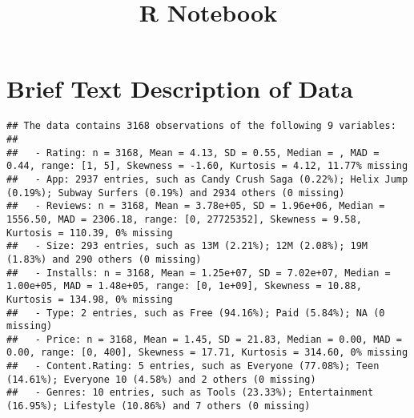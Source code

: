\documentclass[
]{article}
\title{R Notebook}
\author{}
\date{\vspace{-2.5em}}
\begin{document}
\maketitle

\hypertarget{brief-text-description-of-data}{%
\section{Brief Text Description of
Data}\label{brief-text-description-of-data}}

\begin{verbatim}
## The data contains 3168 observations of the following 9 variables:
## 
##   - Rating: n = 3168, Mean = 4.13, SD = 0.55, Median = , MAD = 0.44, range: [1, 5], Skewness = -1.60, Kurtosis = 4.12, 11.77% missing
##   - App: 2937 entries, such as Candy Crush Saga (0.22%); Helix Jump (0.19%); Subway Surfers (0.19%) and 2934 others (0 missing)
##   - Reviews: n = 3168, Mean = 3.78e+05, SD = 1.96e+06, Median = 1556.50, MAD = 2306.18, range: [0, 27725352], Skewness = 9.58, Kurtosis = 110.39, 0% missing
##   - Size: 293 entries, such as 13M (2.21%); 12M (2.08%); 19M (1.83%) and 290 others (0 missing)
##   - Installs: n = 3168, Mean = 1.25e+07, SD = 7.02e+07, Median = 1.00e+05, MAD = 1.48e+05, range: [0, 1e+09], Skewness = 10.88, Kurtosis = 134.98, 0% missing
##   - Type: 2 entries, such as Free (94.16%); Paid (5.84%); NA (0 missing)
##   - Price: n = 3168, Mean = 1.45, SD = 21.83, Median = 0.00, MAD = 0.00, range: [0, 400], Skewness = 17.71, Kurtosis = 314.60, 0% missing
##   - Content.Rating: 5 entries, such as Everyone (77.08%); Teen (14.61%); Everyone 10 (4.58%) and 2 others (0 missing)
##   - Genres: 10 entries, such as Tools (23.33%); Entertainment (16.95%); Lifestyle (10.86%) and 7 others (0 missing)
\end{verbatim}
\end{document}
